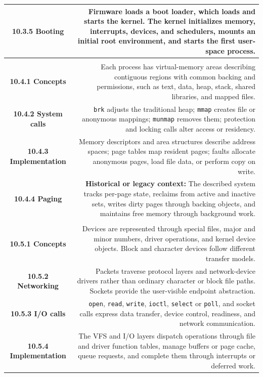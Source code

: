 \documentclass[10pt,letterpaper]{article}
\begin{document}
\begin{longtable}{C N}
\textbf{10.3.5 Booting} & Firmware loads a boot loader, which loads and starts the kernel. The kernel initializes memory, interrupts, devices, and schedulers, mounts an initial root environment, and starts the first user-space process.\\\hline
{}\\*\hline
\textbf{10.4.1 Concepts} & Each process has virtual-memory areas describing contiguous regions with common backing and permissions, such as text, data, heap, stack, shared libraries, and mapped files.\\\hline
\textbf{10.4.2 System calls} & \texttt{brk} adjusts the traditional heap; \texttt{mmap} creates file or anonymous mappings; \texttt{munmap} removes them; protection and locking calls alter access or residency.\\\hline
\textbf{10.4.3 Implementation} & Memory descriptors and area structures describe address spaces; page tables map resident pages; faults allocate anonymous pages, load file data, or perform copy on write.\\\hline
\textbf{10.4.4 Paging} & \textcolor{legacy}{\textbf{Historical or legacy context:}} The described system tracks per-page state, reclaims from active and inactive sets, writes dirty pages through backing objects, and maintains free memory through background work.\\\hline
{}\\*\hline
\textbf{10.5.1 Concepts} & Devices are represented through special files, major and minor numbers, driver operations, and kernel device objects. Block and character devices follow different transfer models.\\\hline
\textbf{10.5.2 Networking} & Packets traverse protocol layers and network-device drivers rather than ordinary character or block file paths. Sockets provide the user-visible endpoint abstraction.\\\hline
\textbf{10.5.3 I/O calls} & \texttt{open}, \texttt{read}, \texttt{write}, \texttt{ioctl}, \texttt{select} or \texttt{poll}, and socket calls express data transfer, device control, readiness, and network communication.\\\hline
\textbf{10.5.4 Implementation} & The VFS and I/O layers dispatch operations through file and driver function tables, manage buffers or page cache, queue requests, and complete them through interrupts or deferred work.\\\hline

\end{longtable}
\end{document}

